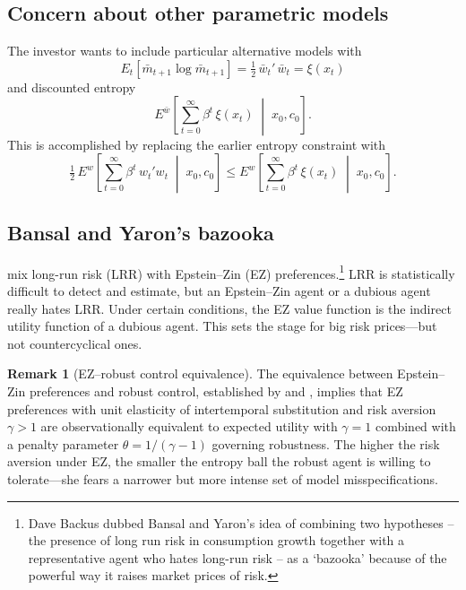 \documentclass[12pt]{article}
\theoremstyle{definition}
\newtheorem{remark}{Remark}
\begin{document}
\subsection{Concern about other parametric models}

The investor wants to include particular alternative models with
\[
   E_t\!\left[\bar m_{t+1}\log\bar m_{t+1}\right]
       = \tfrac{1}{2}\,\bar w_t'\,\bar w_t = \xi(x_t)
\]
and discounted entropy
\[
   E^{\bar w}\!\left[\sum_{t=0}^{\infty} \beta^t\,\xi(x_t)
       \;\middle|\; x_0, c_0\right].
\]
This is accomplished by replacing the earlier entropy constraint with
\begin{equation}
\tfrac{1}{2}\, E^w\!\left[\sum_{t=0}^{\infty} \beta^t\, w_t' w_t
    \;\middle|\; x_0, c_0\right]
    \leq E^w\!\left[\sum_{t=0}^{\infty} \beta^t\,\xi(x_t)
    \;\middle|\; x_0, c_0\right].
\label{eq:tilted-constraint}
\end{equation}

\subsection{Bansal and Yaron's bazooka}

\citet{BY2004} mix long-run risk (LRR) with Epstein--Zin (EZ)
preferences.\footnote{Dave Backus dubbed Bansal and Yaron's idea of combining two hypotheses -- the
presence of long run risk in consumption growth together with a representative agent who hates long-run risk --
as a `bazooka' because of the powerful way it raises market prices of risk.}   LRR is statistically difficult to detect and estimate, but
an Epstein--Zin agent or a dubious agent really hates LRR.  Under
certain conditions, the EZ value function is the indirect utility
function of a dubious agent.  This sets the stage for big risk
prices---but not countercyclical ones.

\begin{remark}[EZ--robust control equivalence]
The equivalence between Epstein--Zin preferences and robust control,
established by \citet{HS2001} and \citet{Maenhout2004}, implies
that EZ preferences with unit elasticity of intertemporal substitution
and risk aversion $\gamma > 1$ are observationally equivalent to expected
utility with $\gamma = 1$ combined with a penalty parameter
$\theta = 1/(\gamma - 1)$ governing robustness.  The higher the risk
aversion under EZ, the smaller the entropy ball the robust agent is
willing to tolerate---she fears a narrower but more intense set of model
misspecifications.
\end{remark}
\end{document}
